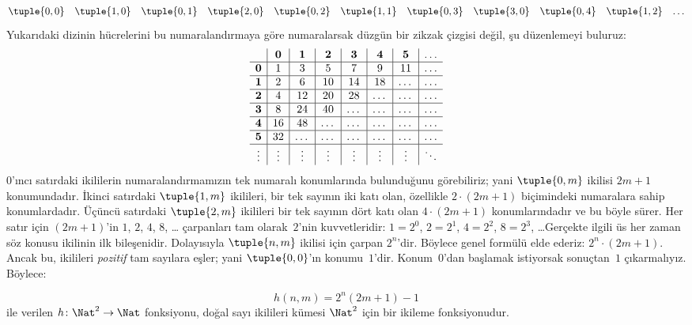 \begin{explain}
\[\begin{array}{@{}cc c c c c c c c c c@{}}
\tuple{0,0} & \tuple{1,0} & \tuple{0,1} & \tuple{2,0}  & \tuple{0,2} &
\tuple{1,1} & \tuple{0,3} & \tuple{3,0}  & \tuple{0,4} &  \tuple{1,2} & \dots \\
\end{array}
\]
Yukarıdaki dizinin hücrelerini bu numaralandırmaya göre numaralarsak düzgün
bir zikzak çizgisi değil, şu düzenlemeyi buluruz:
\[
\begin{array}{ c | c | c | c | c | c | c | c }
& \mathbf 0 & \mathbf 1 & \mathbf 2 & \mathbf 3 & \mathbf 4 & \mathbf 5 & \dots \\
\hline
\mathbf 0 & 1 & 3 & 5 & 7 & 9 & 11 & \dots \\
\hline
\mathbf 1 & 2 & 6 & 10 & 14 & 18 & \dots & \dots \\
\hline
\mathbf 2 & 4 & 12 & 20 & 28 & \dots & \dots & \dots \\
\hline
\mathbf 3 & 8 & 24 & 40 & \dots & \dots & \dots & \dots \\
\hline
\mathbf 4 & 16 & 48 & \dots & \dots & \dots & \dots & \dots \\
\hline
\mathbf 5 & 32 & \dots & \dots & \dots & \dots & \dots & \dots \\
\hline
\vdots & \vdots & \vdots & \vdots & \vdots & \vdots & \vdots & \ddots\\
\end{array}
\]
$0$'ıncı satırdaki ikililerin numaralandırmamızın tek numaralı konumlarında
bulunduğunu görebiliriz; yani $\tuple{0,m}$ ikilisi $2m+1$ konumundadır.
İkinci satırdaki $\tuple{1,m}$ ikilileri, bir tek sayının iki katı olan,
özellikle $2\cdot(2m+1)$ biçimindeki numaralara sahip konumlardadır. Üçüncü
satırdaki $\tuple{2,m}$ ikilileri bir tek sayının dört katı olan
$4\cdot(2m+1)$ konumlarındadır ve bu böyle sürer. Her satır için $(2m+1)$'in
$1$, $2$, $4$, $8$, \dots{} çarpanları tam olarak~$2$'nin kuvvetleridir:
$1=2^0$, $2=2^1$, $4=2^2$, $8=2^3$, \dots\@ Gerçekte ilgili üs her zaman
söz konusu ikilinin ilk bileşenidir. Dolayısıyla $\tuple{n,m}$ ikilisi için
çarpan $2^n$'dir. Böylece genel formülü elde ederiz: $2^n\cdot(2m+1)$.
Ancak bu, ikilileri \emph{pozitif} tam sayılara eşler; yani $\tuple{0,0}$'ın
konumu~$1$'dir. Konum~$0$'dan başlamak istiyorsak sonuçtan~$1$ çıkarmalıyız.
Böylece:
\end{explain}

\begin{ex}
\[
h(n,m) = 2^n (2m+1) - 1
\]
ile verilen $h\colon \Nat^2\to\Nat$ fonksiyonu, doğal sayı ikilileri kümesi
$\Nat^2$ için bir ikileme fonksiyonudur.
\end{ex}

